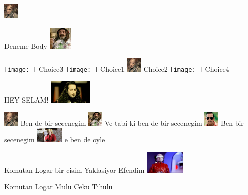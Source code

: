 \documentclass{exam}
\begin{document}
\begin{questions}
\begin{oneparchoices}
\choice \includegraphics[height=2em]{216.jpg}
\end{oneparchoices}
\question Deneme Body\newline
\includegraphics[height=3em]{faruk.jpg} \newline
\begin{oneparchoices}
\choice \texttt{[image: ]}
Choice3
\choice \texttt{[image: ]}
Choice1
\choice \includegraphics[height=2em]{216.jpg}
Choice2
\choice \texttt{[image: ]}
Choice4
\end{oneparchoices}
\question HEY SELAM!\newline
\includegraphics[height=3em]{komutanlogar.jpeg} \newline
\begin{oneparchoices}
\choice \includegraphics[height=2em]{216.jpg}
Ben de bir secenegim
\choice \includegraphics[height=2em]{faruk.jpg}
Ve tabi ki ben de bir secenegim
\choice \includegraphics[height=2em]{arifisik.jpg}
Ben bir secenegim
\choice \includegraphics[height=2em]{ersan.jpg}
e ben de oyle
\end{oneparchoices}
\question Komutan Logar bir cisim Yaklasiyor Efendim\newline
\includegraphics[height=3em]{tihulu.jpeg} \newline
\begin{oneparchoices}
\choice Komutan Logar
\choice Mulu
\choice Ceku
\choice Tihulu
\end{oneparchoices}
\end{questions}
\end{document}
